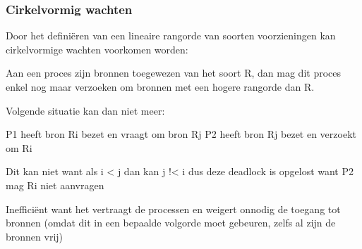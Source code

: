 \subsubsection{Cirkelvormig wachten}

Door het definiëren van een lineaire rangorde van soorten voorzieningen kan cirkelvormige wachten voorkomen worden:

Aan een proces zijn bronnen toegewezen van het soort R, dan mag dit proces enkel nog maar verzoeken om bronnen met een hogere rangorde dan R.

Volgende situatie kan dan niet meer:

P1 heeft bron Ri bezet en vraagt om bron Rj P2 heeft bron Rj bezet en verzoekt om Ri

Dit kan niet want als i < j dan kan j !< i dus deze deadlock is opgelost want P2 mag Ri niet aanvragen 

Inefficiënt want het vertraagt de processen en weigert onnodig de toegang tot bronnen (omdat dit in een bepaalde volgorde moet gebeuren, zelfs al zijn de bronnen vrij)
